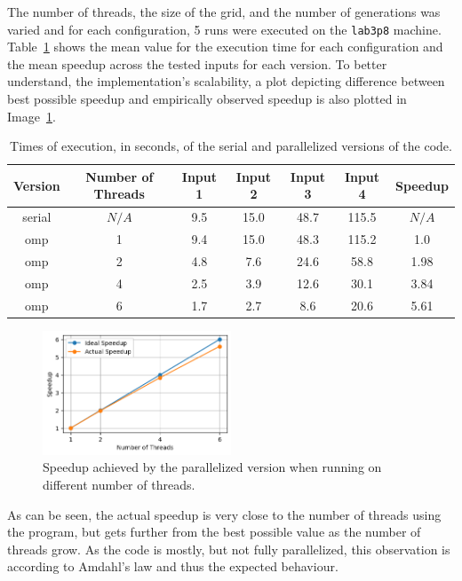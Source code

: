 \documentclass{article}
\begin{document}
The number of threads, the size of the grid, and the number of generations
was varied and for each configuration, 5 runs were executed on the \texttt{lab3p8}
machine. Table~\ref{execution-times} shows the mean value for the execution
time for each configuration and the mean speedup across the tested inputs for
each version. To better understand, the implementation's scalability, a plot
depicting difference between best possible speedup and empirically observed
speedup is also plotted in Image~\ref{speedup}.

\begin{table}[h!]
	\centering
	\begin{tabular}{||c c c c c c c||} 
	 \hline
	 Version & Number of Threads & Input 1 & Input 2 & Input 3 & Input 4 & Speedup\\ [0.5ex] 
	 \hline\hline
	 serial & $N/A$ & 9.5 & 15.0 & 48.7 & 115.5 & $N/A$ \\ 
	 omp & 1 & 9.4 & 15.0 & 48.3 & 115.2 & 1.0 \\ 
	 omp & 2 & 4.8 & 7.6 & 24.6 & 58.8 & 1.98 \\
	 omp & 4 & 2.5 & 3.9 & 12.6 & 30.1 & 3.84 \\
	 omp & 6 & 1.7 & 2.7 & 8.6 & 20.6 & 5.61 \\ [1ex] 
	 \hline
	\end{tabular}
	\caption{Times of execution, in seconds, of the serial and parallelized versions of the code.}
	\label{execution-times}
\end{table}

\begin{figure}[htbp]
    \centering
    \includegraphics[width=0.5\textwidth]{img/speedup-threads.png}
    \caption{Speedup achieved by the parallelized version when running on different number of threads.}
    \label{speedup}
\end{figure}

As can be seen, the actual speedup is very close to the number of threads
using the program, but gets further from the best possible value as the number
of threads grow. As the code is mostly, but not fully parallelized, this 
observation is according to Amdahl's law and thus the expected behaviour.
\end{document}

